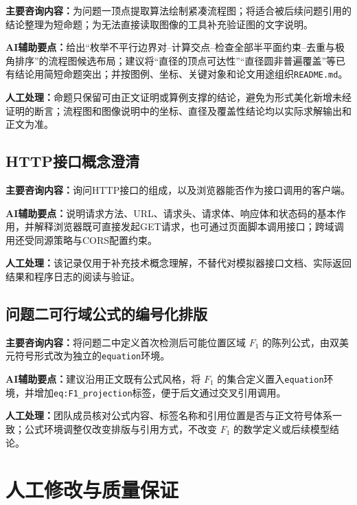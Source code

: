 \documentclass[12pt,a4paper]{article}
\begin{document}
\textbf{主要咨询内容：}为问题一顶点提取算法绘制紧凑流程图；将适合被后续问题引用的结论整理为短命题；为无法直接读取图像的工具补充验证图的文字说明。

\textbf{AI辅助要点：}给出“枚举不平行边界对--计算交点--检查全部半平面约束--去重与极角排序”的流程图候选布局；建议将“直径的顶点可达性”“直径圆非普遍覆盖”等已有结论用简短命题突出；并按图例、坐标、关键对象和论文用途组织\texttt{README.md}。

\textbf{人工处理：}命题只保留可由正文证明或算例支撑的结论，避免为形式美化新增未经证明的断言；流程图和图像说明中的坐标、直径及覆盖性结论均以实际求解输出和正文为准。

\subsection{HTTP接口概念澄清}

\textbf{主要咨询内容：}询问HTTP接口的组成，以及浏览器能否作为接口调用的客户端。

\textbf{AI辅助要点：}说明请求方法、URL、请求头、请求体、响应体和状态码的基本作用，并解释浏览器既可直接发起GET请求，也可通过页面脚本调用接口；跨域调用还受同源策略与CORS配置约束。

\textbf{人工处理：}该记录仅用于补充技术概念理解，不替代对模拟器接口文档、实际返回结果和程序日志的阅读与验证。

\subsection{问题二可行域公式的编号化排版}

\textbf{主要咨询内容：}将问题二中定义首次检测后可能位置区域 $F_1$ 的陈列公式，由双美元符号形式改为独立的\texttt{equation}环境。

\textbf{AI辅助要点：}建议沿用正文既有公式风格，将 $F_1$ 的集合定义置入\texttt{equation}环境，并增加\texttt{eq:F1\_projection}标签，便于后文通过交叉引用调用。

\textbf{人工处理：}团队成员核对公式内容、标签名称和引用位置是否与正文符号体系一致；公式环境调整仅改变排版与引用方式，不改变 $F_1$ 的数学定义或后续模型结论。

\section{人工修改与质量保证}
\end{document}
